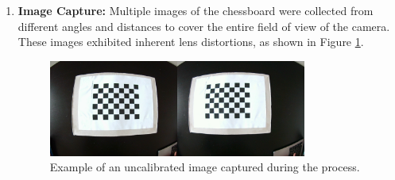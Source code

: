     \begin{enumerate}
        \item \textbf{Image Capture:} 
        Multiple images of the chessboard were collected from different angles and distances to cover the entire field of view of the camera. These images exhibited inherent lens distortions, as shown in Figure \ref{fig:imagen_descalibrada}.

        \begin{center}
            \begin{figure}[H]
                \centering
                \includegraphics[width=0.8\textwidth]{pictures/imagen_descalibrada.jpg}
                \caption{Example of an uncalibrated image captured during the process.}
                \label{fig:imagen_descalibrada}
            \end{figure}
        \end{center}
    

\end{enumerate}
